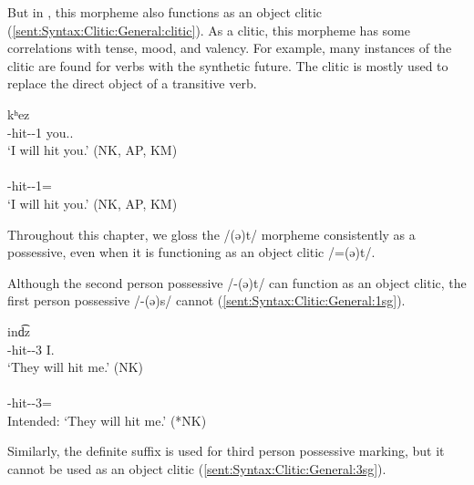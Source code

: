But in {{\iaIA}}, this morpheme also functions as an object clitic (\ref{sent:Syntax:Clitic:General:clitic}).  As a clitic, this morpheme  has some correlations with tense,  mood, and valency. For example, many instances of the clitic are found for verbs with the  synthetic future.  The clitic is mostly used  to replace the direct object of a transitive verb. 

\begin{exe}
	\ex \label{sent:Syntax:Clitic:General:clitic}
	\begin{xlist}
		\ex {} {kʰez}   
		\\
		{\fut}-hit-{\thgloss}-1{\sg} you.{\sg}.{\dat}
		\\
		\trans	`I {will} hit you.' \hfill   (NK, AP, KM)
		\\
		\ex {} 
		\\
		{\fut}-hit-{\thgloss}-1{\sg}={\possSsg}
		\\
		\trans	`I {will} hit you.' \hfill   (NK, AP, KM)
		\\
	\end{xlist}
	
\end{exe}

Throughout this chapter, we gloss the /{(ə)t}/ morpheme consistently as a possessive, even when it is functioning as an object clitic /=(ə)t/. 

Although the second person possessive /{-(ə)t}/ can function as an object clitic, the first person possessive /{-(ə)s}/ cannot (\ref{sent:Syntax:Clitic:General:1sg}). 


\begin{exe}
	\ex \label{sent:Syntax:Clitic:General:1sg}
	\begin{xlist}
		\ex {} {ind͡z}   
		\\
		{\fut}-hit-{\thgloss}-3{\pl} I.{\dat}
		\\
		\trans	`They {will} hit me.' \hfill   (NK)
		\\
		\armenian{Կը խփեն ինձ։}
		\ex \gll *{kə-χəpʰ-e-n=əs} 
		\\
		{\fut}-hit-{\thgloss}-3{\pl}={\possFsg}
		\\
		\trans	Intended: `They  {will} hit me.' \hfill   (*NK)
		
	\end{xlist}
	
\end{exe}

Similarly, the definite suffix is used for third person possessive marking, but it cannot be used as an object clitic (\ref{sent:Syntax:Clitic:General:3sg}). 

